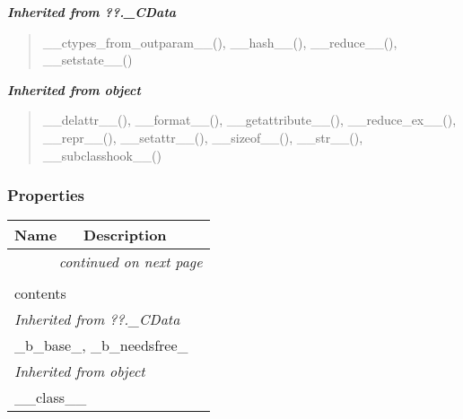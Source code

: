 \large{\textbf{\textit{Inherited from ??.\_CData}}}

\begin{quote}
\_\_ctypes\_from\_outparam\_\_(), \_\_hash\_\_(), \_\_reduce\_\_(), \_\_setstate\_\_()
\end{quote}

\large{\textbf{\textit{Inherited from object}}}

\begin{quote}
\_\_delattr\_\_(), \_\_format\_\_(), \_\_getattribute\_\_(), \_\_reduce\_ex\_\_(), \_\_repr\_\_(), \_\_setattr\_\_(), \_\_sizeof\_\_(), \_\_str\_\_(), \_\_subclasshook\_\_()
\end{quote}


  \subsubsection{Properties}

    \vspace{-1cm}
\hspace{\varindent}\begin{longtable}{|p{\varnamewidth}|p{\vardescrwidth}|l}
\cline{1-2}
\cline{1-2} \centering \textbf{Name} & \centering \textbf{Description}& \\
\cline{1-2}
\endhead\cline{1-2}\multicolumn{3}{r}{\small\textit{continued on next page}}\\\endfoot\cline{1-2}
\endlastfoot\multicolumn{2}{|l|}{\textit{Inherited from \_ctypes.\_Pointer}}\\
\multicolumn{2}{|p{\varwidth}|}{\raggedright contents}\\
\cline{1-2}
\multicolumn{2}{|l|}{\textit{Inherited from ??.\_CData}}\\
\multicolumn{2}{|p{\varwidth}|}{\raggedright \_b\_base\_, \_b\_needsfree\_}\\
\cline{1-2}
\multicolumn{2}{|l|}{\textit{Inherited from object}}\\
\multicolumn{2}{|p{\varwidth}|}{\raggedright \_\_class\_\_}\\
\cline{1-2}
\end{longtable}


